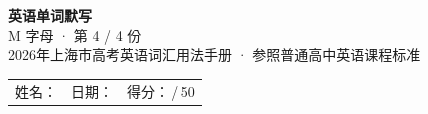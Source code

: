 \documentclass[10pt,a4paper]{article}
\begin{document}
\pagestyle{plain}

\begin{center}
{\LARGE\bfseries 英语单词默写}\\[0.22em]
{\large M 字母 · 第 4 / 4 份}\\[0.18em]
{\small 2026年上海市高考英语词汇用法手册 · 参照普通高中英语课程标准}
\end{center}

\vspace{0.25em}
\noindent\begin{tabular}{@{}p{}@{}p{}@{}p{}@{}}
姓名：\underline{\hspace{2.0cm}} & 日期：\underline{\hspace{2.0cm}} & 得分：\underline{\hspace{1.3cm}}\,/\,50 \\
\end{tabular}

\vspace{0.3em}

\vspace{0.08em}
\end{document}

